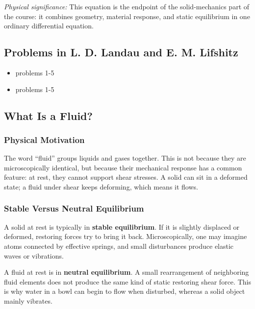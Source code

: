\documentclass[../main.tex]{subfiles}
\begin{document}
\textit{Physical significance:} This equation is the endpoint of the solid-mechanics part of the course: it combines geometry, material response, and static equilibrium in one ordinary differential equation.

\subsection*{Problems in  L. D. Landau and E. M. Lifshitz}
\begin{itemize}
  \item {} problems 1-5
  \item  {} problems 1-5
\end{itemize}%
\subsection{What Is a Fluid?}\label{sec:lec10:what-is-fluid}

\subsubsection*{Physical Motivation}
The word ``fluid'' groups liquids and gases together. This is not because they are microscopically identical, but because their mechanical response has a common feature: at rest, they cannot support shear stresses. A solid can sit in a deformed state; a fluid under shear keeps deforming, which means it flows.

\subsubsection*{Stable Versus Neutral Equilibrium}
A solid at rest is typically in \textbf{stable equilibrium}. If it is slightly displaced or deformed, restoring forces try to bring it back. Microscopically, one may imagine atoms connected by effective springs, and small disturbances produce elastic waves or vibrations.

A fluid at rest is in \textbf{neutral equilibrium}. A small rearrangement of neighboring fluid elements does not produce the same kind of static restoring shear force. This is why water in a bowl can begin to flow when disturbed, whereas a solid object mainly vibrates.
\end{document}
